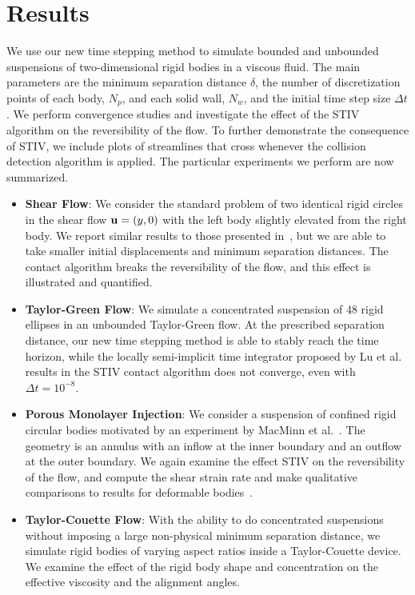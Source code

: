 \documentclass[AMA,STIX1COL]{WileyNJD-v2}
\begin{document}
\section{Results}\label{s:results}
We use our new time stepping method to simulate bounded and unbounded
suspensions of two-dimensional rigid bodies in a viscous fluid.  The
main parameters are the minimum separation distance $\delta$, the number
of discretization points of each body, $N_p$, and each solid wall,
$N_w$, and the initial time step size $\Delta t$. We perform convergence
studies and investigate the effect of the STIV algorithm on the
reversibility of the flow.  To further demonstrate the consequence of
STIV, we include plots of streamlines that cross whenever the collision
detection algorithm is applied.  The particular experiments we perform
are now summarized.
\begin{itemize}
  \item {\bf Shear Flow}: We consider the standard problem of two
  identical rigid circles in the shear flow ${\mathbf{u}} = (y,0)$ with the left
  body slightly elevated from the right body.  We report similar results
  to those presented in~\cite{Lu2017}, but we are able to take smaller
  initial displacements and minimum separation distances.  The contact
  algorithm breaks the reversibility of the flow, and this effect is
  illustrated and quantified.

  \item {\bf Taylor-Green Flow}: We simulate a concentrated suspension
  of 48 rigid ellipses in an unbounded Taylor-Green flow. At the
  prescribed separation distance, our new time stepping method is able
  to stably reach the time horizon, while the locally semi-implicit time
  integrator proposed by Lu et al.~\cite{Lu2017} results in the STIV
  contact algorithm does not converge, even with $\Delta t = 10^{-8}$.

  \item {\bf Porous Monolayer Injection}: We consider a suspension of
  confined rigid circular bodies motivated by an experiment by MacMinn
  et al.~\cite{MacMinn2015}.  The geometry is an annulus with an inflow
  at the inner boundary and an outflow at the outer boundary.  We again
  examine the effect STIV on the reversibility of the flow, and compute
  the shear strain rate and make qualitative comparisons to results for
  deformable bodies~\cite{MacMinn2015}.

  \item {\bf Taylor-Couette Flow}: With the ability to do concentrated
  suspensions without imposing a large non-physical minimum separation
  distance, we simulate rigid bodies of varying aspect ratios inside a
  Taylor-Couette device.  We examine the effect of the rigid body shape
  and concentration on the effective viscosity and the alignment angles.
\end{itemize}
\end{document}
